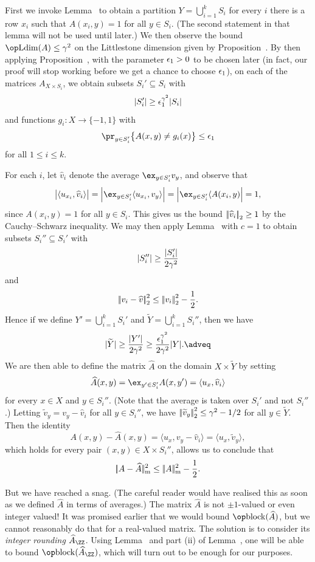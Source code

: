 First we invoke Lemma~{\lempartition} to obtain a partition $Y = \bigcup_{i=1}^k S_i$
for every $i$ there is a row $x_i$ such that $A(x_i,y) = 1$ for all $y\in S_i$. (The second statement
in that lemma will not be used until later.)
We then observe the bound
$\Ldim(A) \le \gamma^2$ on the Littlestone dimension given by Proposition~{\propldimbound}.
By then applying Proposition~{\propfixedvector}, with the parameter $\epsilon_1>0$ to be chosen later
(in fact, our proof will stop working before we get a chance to choose $\epsilon_1$),
on each of the matrices $A_{X\times S_i}$, we obtain subsets $S_i'\subseteq S_i$ with
$$|S_i'| \ge \epsilon_1^{\gamma^2} |S_i|$$
and functions $g_i : X\to \{-1,1\}$ with
$$\pr_{y\in S_i'} \bigl\{ A(x,y) \ne g_i(x) \bigr\} \le \eps_1$$
for all $1\le i\le k$.

For each $i$, let $\hat v_i$ denote the average $\ex_{y\in S_i'} v_y$, and observe that
$$\bigl| \langle u_{x_i}, \hat v_i\rangle\bigr|
= \Bigl| \ex_{y\in S_i'} \langle u_{x_i}, v_y\rangle \Bigr|
= \Bigl| \ex_{y\in S_i'} \langle A(x_i,y) \Bigr|
= 1,$$
since $A(x_i, y) = 1$ for all $y\in S_i$. This gives us the bound $\left|\!\left|\widehat v_i\right|\!\right|_2 \ge 1$ by the
Cauchy--Schwarz inequality. We may then apply Lemma~{\lemaveragevector} with $c=1$ to obtain subsets
$S_i''\subseteq S_i'$ with
$$|S_i''| \ge {|S_i'|\over 2\gamma^2}$$
and
$$\left|\!\left|v_i - \widehat v\right|\!\right|_2^2 \le \left|\!\left|v_i\right|\!\right|_2^2 - {1\over 2}.$$
Hence if we define $Y' = \bigcup_{i=1}^k S_i'$ and $\tilde Y = \bigcup_{i=1}^k S_i''$,
then we have
\edef\eqthrowaway{\the\eqcount}
$$|\tilde Y| \ge {|Y'| \over 2\gamma^2} \ge {\eps_1^{\gamma^2}\over 2\gamma^2}|Y|.\adveq$$
We are then able to define the matrix $\hat A$ on the domain $X\times \tilde Y$ by setting
$$\hat A(x,y) = \ex_{y'\in S_i'} A(x,y') = \langle u_x, \hat v_i\rangle$$
for every $x\in X$ and $y\in S_i''$. (Note that the average is taken over $S_i'$ and not $S_i''$.)
Letting $\tilde v_y = v_y - \hat v_i$ for all $y\in S_i''$, we have
$\left|\!\left|\widetilde v_y\right|\!\right|_2^2\le \gamma^2 - 1/2$ for all $y\in \tilde Y$. Then the identity
$$A(x,y)-\hat A(x,y) = \langle u_x, v_y - \hat v_i\rangle = \langle u_x,\tilde v_y\rangle,$$
which holds for every pair $(x,y)\in X\times S_i''$, allows us to conclude that
$$|\!|A-\widehat A|\!|_{\rm m}^2 \le |\!|A|\!|_{\rm m}^2 - {1\over 2}.$$

But we have reached a snag. (The careful reader would have realised this as soon as we defined $\hat A$
in terms of averages.) The matrix $\hat A$ is not $\pm 1$-valued or even integer valued!
It was promised earlier that we would bound $\block(\hat A)$, but we cannot reasonably do that for
a real-valued matrix. The solution is to consider its {\it integer rounding} $\hat A_\ZZ$.
Using Lemma~{\lemblockbound} and part (ii) of Lemma~{\lempartition}, one will be able
to bound $\block(\hat A_\ZZ)$, which will turn out to be enough for our purposes.

